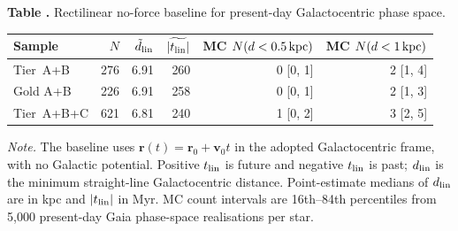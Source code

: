 \begin{center}
\label{tab:rectilinear_baseline}
\begin{minipage}{\columnwidth}
\small\textbf{Table \thetable.} Rectilinear no-force baseline for present-day Galactocentric phase space.
\end{minipage}
\vspace{0.4ex}

\scriptsize
\setlength{\tabcolsep}{2.5pt}
\begin{tabular}{lrrrrr}
\hline\hline
Sample & $N$ & $\tilde d_{\rm lin}$ & $\widetilde{|t_{\rm lin}|}$ & MC $N(d<0.5{\rm\,kpc})$ & MC $N(d<1{\rm\,kpc})$ \\
\hline
Tier~A+B & 276 & 6.91 & 260 & 0 [0, 1] & 2 [1, 4] \\
Gold A+B & 226 & 6.91 & 258 & 0 [0, 1] & 2 [1, 3] \\
Tier~A+B+C & 621 & 6.81 & 240 & 1 [0, 2] & 3 [2, 5] \\
\hline
\end{tabular}
\vspace{0.5ex}

\begin{minipage}{0.95\columnwidth}
\footnotesize
\textit{Note.} The baseline uses $\mathbf{r}(t)=\mathbf{r}_0+\mathbf{v}_0t$ in the adopted Galactocentric frame, with no Galactic potential.  Positive $t_{\rm lin}$ is future and negative $t_{\rm lin}$ is past; $d_{\rm lin}$ is the minimum straight-line Galactocentric distance.  Point-estimate medians of $d_{\rm lin}$ are in kpc and $|t_{\rm lin}|$ in Myr.  MC count intervals are 16th--84th percentiles from 5{,}000 present-day Gaia phase-space realisations per star.
\end{minipage}
\end{center}
